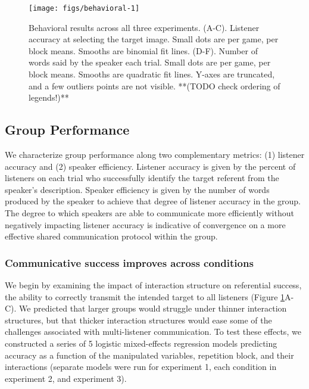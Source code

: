 \documentclass[
  english,
]{article}
\begin{document}
\begin{figure}[t!]

{\centering \texttt{[image: figs/behavioral-1]} 

}

\caption{Behavioral results across all three experiments. (A-C). Listener accuracy at selecting the target image. Small dots are per game, per block means. Smooths are binomial fit lines.  (D-F). Number of words said by the speaker each trial. Small dots are per game, per block means. Smooths are quadratic fit lines. Y-axes are truncated, and a few outliers points are not visible. **(TODO check ordering of legends!)**}\label{fig:behavioral}
\end{figure}

\hypertarget{group-performance}{%
\subsection{Group Performance}\label{group-performance}}

We characterize group performance along two complementary metrics: (1) listener accuracy and (2) speaker efficiency.
Listener accuracy is given by the percent of listeners on each trial who successfully identify the target referent from the speaker's description.
Speaker efficiency is given by the number of words produced by the speaker to achieve that degree of listener accuracy in the group.
The degree to which speakers are able to communicate more efficiently without negatively impacting listener accuracy is indicative of convergence on a more effective shared communication protocol within the group.

\hypertarget{communicative-success-improves-across-conditions}{%
\subsubsection{Communicative success improves across conditions}\label{communicative-success-improves-across-conditions}}

We begin by examining the impact of interaction structure on referential success, the ability to correctly transmit the intended target to all listeners (Figure \ref{fig:behavioral}A-C).
We predicted that larger groups would struggle under thinner interaction structures, but that thicker interaction structures would ease some of the challenges associated with multi-listener communication.
To test these effects, we constructed a series of 5 logistic mixed-effects regression models predicting accuracy as a function of the manipulated variables, repetition block, and their interactions (separate models were run for experiment 1, each condition in experiment 2, and experiment 3).
\end{document}
